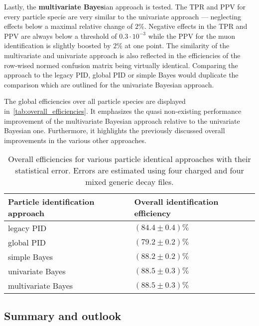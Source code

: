 Lastly, the \textbf{multivariate Bayes}ian approach is tested. The TPR and PPV for every particle specie are very similar to the univariate approach --- neglecting effects below a maximal relative change of $2 \%$. Negative effects in the TPR and PPV are always below a threshold of $0.3 \cdot 10^{-3}$ while the PPV for the muon identification is slightly boosted by $2 \%$ at one point.
The similarity of the multivariate and univariate approach is also reflected in the efficiencies of the row-wised normed confusion matrix being virtually identical. Comparing the approach to the legacy PID, global PID or simple Bayes would duplicate the comparison which are outlined for the univariate Bayesian approach.

The global efficiencies over all particle species are displayed in~\autoref{tab:overall_efficiencies}. It emphasizes the quasi non-existing performance improvement of the multivariate Bayesian approach relative to the univariate Bayesian one. Furthermore, it highlights the previously discussed overall improvements in the various other approaches.

\begin{table}[ht]
	\centering
	\begin{tabular}{l|l}
		Particle identification approach & Overall identification efficiency \\
		\hline
		legacy PID & $(84.4 \pm 0.4) \%$ \\ %
		global PID & $(79.2 \pm 0.2) \%$ \\ %
		simple Bayes & $(88.2 \pm 0.2) \%$ \\ %
		univariate Bayes & $(88.5 \pm 0.3) \%$ \\ %
		multivariate Bayes & $(88.5 \pm 0.3) \%$ %
	\end{tabular}
	\caption{Overall efficiencies for various particle identical approaches with their statistical error. Errors are estimated using four charged and four mixed generic decay files.}
	\label{tab:overall_efficiencies}
\end{table}

\subsection{Summary and outlook}
\label{subsc:bayesian_approach_summary}

